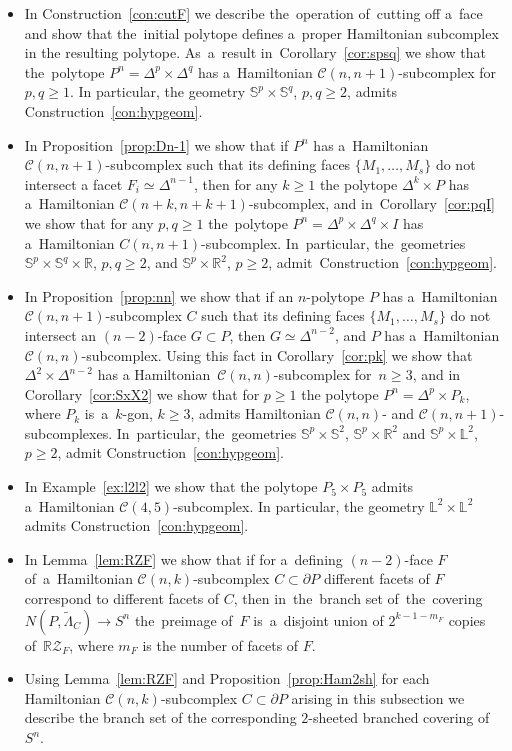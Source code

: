 \documentclass[12pt]{amsart}
\theoremstyle{definition}
\theoremstyle{remark}
\begin{document}
\begin{itemize}
Construction~\ref{con:hypgeom} for $n\geqslant 3$.
\item  In Construction~\ref{con:cutF} we describe
the~operation of~cutting off a~face and show that the~initial polytope defines a~proper Hamiltonian
subcomplex in the resulting polytope. As~a~result in~Corollary~\ref{cor:spsq} we show that 
the~polytope $P^n=\Delta^p\times \Delta^q$
has a~Hamiltonian $\mathcal{C}(n,n+1)$-subcomplex for $p,q\geqslant 1$. In particular, 
the geometry $\mathbb S^p\times\mathbb S^q$, $p,q\geqslant 2$, admits Construction~\ref{con:hypgeom}.  
\item In Proposition~\ref{prop:Dn-1} we show that if  $P^n$ has a~Hamiltonian $\mathcal{C}(n,n+1)$-subcomplex such
that its defining faces $\{M_1,\dots, M_s\}$ do not intersect a facet $F_i\simeq \Delta^{n-1}$,
then for any $k\geqslant 1$ the polytope $\Delta^k\times P$ has a~Hamiltonian 
$\mathcal{C}(n+k,n+k+1)$-subcomplex, and in~Corollary~\ref{cor:pqI} we show that
for any $p,q\geqslant 1$ the~polytope $P^n=\Delta^p\times\Delta^q\times I$
has a~Hamiltonian $C(n, n+1)$-subcomplex. 
In~particular, the~geometries $\mathbb S^p\times \mathbb S^q\times \mathbb R$, $p,q\geqslant 2$, and 
$\mathbb S^p\times \mathbb R^2$, $p\geqslant 2$, admit~Construction~\ref{con:hypgeom}.
\item In Proposition~\ref{prop:nn} we show that if an $n$-polytope $P$ has a~Hamiltonian $\mathcal{C}(n,n+1)$-subcomplex $C$ such
that its defining faces $\{M_1,\dots, M_s\}$ do not intersect an $(n-2)$-face $G\subset P$, then $G\simeq \Delta^{n-2}$,
and $P$ has a~Hamiltonian $\mathcal{C}(n,n)$-subcomplex. Using this fact in Corollary~\ref{cor:pk}
we show that $\Delta^2\times \Delta^{n-2}$ has a Hamiltonian~$\mathcal{C}(n,n)$-subcomplex for~$n\geqslant 3$,
and in Corollary~\ref{cor:SxX2} we show that for $p\geqslant 1$ the polytope $P^n=\Delta^p\times P_k$,
where $P_k$ is~a~$k$-gon, $k\geqslant 3$, admits Hamiltonian $\mathcal{C}(n,n)$- and $\mathcal{C}(n,n+1)$-subcomplexes. 
In~particular, the~geometries $\mathbb S^p\times \mathbb S^2$, $\mathbb S^p\times \mathbb R^2$ and 
$\mathbb S^p\times \mathbb L^2$, $p\geqslant 2$, admit Construction~\ref{con:hypgeom}.

\item In Example~\ref{ex:l2l2} we show that the polytope $P_5\times P_5$ admits  
a~Hamiltonian $\mathcal{C}(4,5)$-subcomplex. In particular,
the geometry $\mathbb L^2\times\mathbb L^2$ admits Construction~\ref{con:hypgeom}. 
\item In Lemma~\ref{lem:RZF} we show that if for a~defining $(n-2)$-face $F$ of~a~Hamiltonian $\mathcal{C}(n,k)$-subcomplex $C\subset \partial P$ different facets of $F$ correspond to different facets of $C$, then 
in~the~branch set of~the~covering $N(P,\widetilde{\Lambda}_C)\to S^n$ the~preimage of~$F$ 
is~a~disjoint union of $2^{k-1-m_F}$ copies of~$\mathbb R\mathcal{Z}_F$, where $m_F$ is the number 
of facets of $F$.
\item Using Lemma~\ref{lem:RZF} and Proposition~\ref{prop:Ham2sh} for each 
Hamiltonian $\mathcal{C}(n,k)$-subcomplex $C\subset \partial P$  arising
in this subsection we describe the branch set of the corresponding $2$-sheeted
branched covering of~$S^n$.
\end{itemize}
\end{document}
